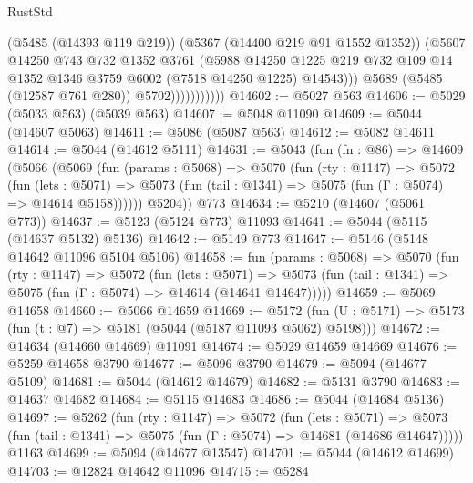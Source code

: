 \begin{lexlean}{RustStd}
\begin{coremodule}
                            (@5485 (@14393 @119 @219))
                            (@5367 (@14400 @219 @91 @1552 @1352))
                            (@5607
                              @14250
                              @743
                              @732
                              @1352
                              @3761
                              (@5988
                                @14250
                                @1225
                                @219
                                @732
                                @109
                                @14
                                @1352
                                @1346
                                @3759
                                @6002
                                (@7518 @14250 @1225)
                                @14543)))
                          @5689
                          (@5485 (@12587 @761 @280))
                          @5702)))))))))))
@14602 := @5027 @563
@14606 := @5029 (@5033 @563) (@5039 @563)
@14607 := @5048 @11090
@14609 := @5044 (@14607 @5063)
@14611 := @5086 (@5087 @563)
@14612 := @5082 @14611
@14614 := @5044 (@14612 @5111)
@14631 := @5043
    (fun (fn : @86) =>
    @14609
      (@5066
        (@5069
          (fun (params : @5068) =>
          @5070
            (fun (rty : @1147) =>
            @5072
              (fun (lets : @5071) =>
              @5073 (fun (tail : @1341) => @5075 (fun (Γ : @5074) => @14614 @5158))))))
        @5204))
    @773
@14634 := @5210 (@14607 (@5061 @773))
@14637 := @5123 (@5124 @773) @11093
@14641 := @5044 (@5115 (@14637 @5132) @5136)
@14642 := @5149 @773
@14647 := @5146 (@5148 @14642 @11096 @5104 @5106)
@14658 := fun (params : @5068) =>
  @5070
    (fun (rty : @1147) =>
    @5072
      (fun (lets : @5071) =>
      @5073 (fun (tail : @1341) => @5075 (fun (Γ : @5074) => @14614 (@14641 @14647)))))
@14659 := @5069 @14658
@14660 := @5066 @14659
@14669 := @5172
    (fun (U : @5171) => @5173 (fun (t : @7) => @5181 (@5044 (@5187 @11093 @5062) @5198)))
@14672 := @14634 (@14660 @14669) @11091
@14674 := @5029 @14659 @14669
@14676 := @5259 @14658 @3790
@14677 := @5096 @3790
@14679 := @5094 (@14677 @5109)
@14681 := @5044 (@14612 @14679)
@14682 := @5131 @3790
@14683 := @14637 @14682
@14684 := @5115 @14683
@14686 := @5044 (@14684 @5136)
@14697 := @5262
    (fun (rty : @1147) =>
    @5072
      (fun (lets : @5071) =>
      @5073 (fun (tail : @1341) => @5075 (fun (Γ : @5074) => @14681 (@14686 @14647)))))
    @1163
@14699 := @5094 (@14677 @13547)
@14701 := @5044 (@14612 @14699)
@14703 := @12824 @14642 @11096
@14715 := @5284

\end{coremodule}
\end{lexlean}
